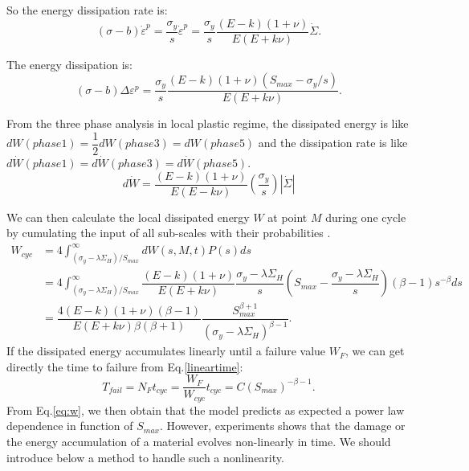 \documentclass[3p,times,procedia,number]{elsarticle}
\begin{document}
\vspace{6pt}
\noindent
So the energy dissipation rate is: $$(\sigma-b)\dot{\varepsilon}^p=\dfrac{\sigma_y}{s}\dot{\varepsilon}^p=\dfrac{\sigma_y}{s}\dfrac{(E- k)(1+\nu)}{E(E+k\nu)}\dot{\Sigma}.$$

\noindent
The energy dissipation is: $$(\sigma-b)\Delta\varepsilon^p=\dfrac{\sigma_y}{s}\dfrac{(E- k)(1+\nu)(S_{max}-\sigma_y/s)}{E(E+k\nu)}.$$


From the three phase analysis in local plastic regime, the dissipated energy is like $dW(phase1)=\dfrac{1}{2}dW(phase3)=dW(phase5)$ and the dissipation rate is like $d\dot{W}(phase1)=d\dot{W}(phase3)=d\dot{W}(phase5)$.
\begin{equation}d\dot{W}=\dfrac{(E-k)(1+\nu) }{E(E-k\nu)}\left( \dfrac{\sigma_y}{s}\right) \left| \dot{\Sigma}\right|   
\end{equation}

We can then calculate  the local dissipated energy $W$  at point $M$ during one cycle by cumulating the input of all sub-scales with their probabilities \cite{zepeng}.
\begin{equation}
	\begin{split}
		W_{cyc}&=4\int_{\left( \sigma_y-\lambda \Sigma_H\right) /S_{max}}^{\infty}dW(s,M,t)P(s)ds
		\\&=4\int_{\left( \sigma_y-\lambda \Sigma_H\right) /S_{max}}^{\infty}\dfrac{(E-k)(1+\nu) }{E(E+k\nu)}\dfrac{\sigma_y-\lambda \Sigma_H}{s}\left(S_{max}-\dfrac{\sigma_y-\lambda \Sigma_H}{s}\right)\left( \beta-1\right) s^{-\beta}ds
		\\&=\dfrac{4(E-k)(1+\nu)\left( \beta-1\right) }{ E(E+k\nu)\beta\left( \beta+1\right) }\dfrac{S_{max}^{\beta+1}}{\left( \sigma_y-\lambda \Sigma_H\right) ^{\beta-1}}.
	\end{split}
	\label{eq:w}
\end{equation}
If the dissipated energy accumulates linearly until a failure value $W_F$, we can get directly the time to failure from Eq.\eqref{lineartime}:
\begin{equation}
	T_{fail}=N_{F}t_{cyc}=\dfrac{W_F}{W_{cyc}}t_{cyc}=C(S_{max})^{-\beta-1}.
	\label{lineartime}
\end{equation}
From Eq.\eqref{eq:w}, we then obtain that the model predicts as expected a power law dependence in function of $S_{max}$.
However, experiments shows that the damage or the energy accumulation of a material evolves non-linearly in time. We should introduce below a method to handle such a nonlinearity.
\end{document}
